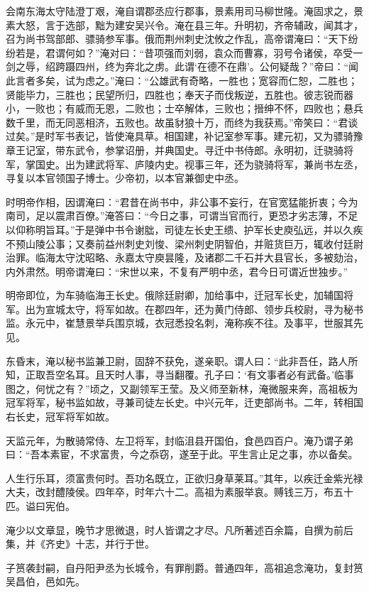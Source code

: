 \documentclass[12pt,UTF8]{ctexbook}
\begin{document}
会南东海太守陆澄丁艰，淹自谓郡丞应行郡事，景素用司马柳世隆。淹固求之，景素大怒，言于选部，黜为建安吴兴令。淹在县三年。升明初，齐帝辅政，闻其才，召为尚书驾部郎、骠骑参军事。俄而荆州刺史沈攸之作乱，高帝谓淹曰：“天下纷纷若是，君谓何如？”淹对曰：“昔项强而刘弱，袁众而曹寡，羽号令诸侯，卒受一剑之辱，绍跨蹑四州，终为奔北之虏。此谓‘在德不在鼎’。公何疑哉？”帝曰：“闻此言者多矣，试为虑之。”淹曰：“公雄武有奇略，一胜也；宽容而仁恕，二胜也；贤能毕力，三胜也；民望所归，四胜也；奉天子而伐叛逆，五胜也。彼志锐而器小，一败也；有威而无恩，二败也；士卒解体，三败也；搢绅不怀，四败也；悬兵数千里，而无同恶相济，五败也。故虽豺狼十万，而终为我获焉。”帝笑曰：“君谈过矣。”是时军书表记，皆使淹具草。相国建，补记室参军事。建元初，又为骠骑豫章王记室，带东武令，参掌诏册，并典国史。寻迁中书侍郎。永明初，迁骁骑将军，掌国史。出为建武将军、庐陵内史。视事三年，还为骁骑将军，兼尚书左丞，寻复以本官领国子博士。少帝初，以本官兼御史中丞。

时明帝作相，因谓淹曰：“君昔在尚书中，非公事不妄行，在官宽猛能折衷；今为南司，足以震肃百僚。”淹答曰：“今日之事，可谓当官而行，更恐才劣志薄，不足以仰称明旨耳。”于是弹中书令谢朏，司徒左长史王缋、护军长史庾弘远，并以久疾不预山陵公事；又奏前益州刺史刘悛、梁州刺史阴智伯，并赃货巨万，辄收付廷尉治罪。临海太守沈昭略、永嘉太守庾昙隆，及诸郡二千石并大县官长，多被劾治，内外肃然。明帝谓淹曰：“宋世以来，不复有严明中丞，君今日可谓近世独步。”

明帝即位，为车骑临海王长史。俄除廷尉卿，加给事中，迁冠军长史，加辅国将军。出为宣城太守，将军如故。在郡四年，还为黄门侍郎、领步兵校尉，寻为秘书监。永元中，崔慧景举兵围京城，衣冠悉投名刺，淹称疾不往。及事平，世服其先见。

东昏末，淹以秘书监兼卫尉，固辞不获免，遂亲职。谓人曰：“此非吾任，路人所知，正取吾空名耳。且天时人事，寻当翻覆。孔子曰：‘有文事者必有武备。’临事图之，何忧之有？”顷之，又副领军王莹。及义师至新林，淹微服来奔，高祖板为冠军将军，秘书监如故，寻兼司徒左长史。中兴元年，迁吏部尚书。二年，转相国右长史，冠军将军如故。

天监元年，为散骑常侍、左卫将军，封临沮县开国伯，食邑四百户。淹乃谓子弟曰：“吾本素宦，不求富贵，今之忝窃，遂至于此。平生言止足之事，亦以备矣。

人生行乐耳，须富贵何时。吾功名既立，正欲归身草莱耳。”其年，以疾迁金紫光禄大夫，改封醴陵侯。四年卒，时年六十二。高祖为素服举哀。赙钱三万，布五十匹。谥曰宪伯。

淹少以文章显，晚节才思微退，时人皆谓之才尽。凡所著述百余篇，自撰为前后集，并《齐史》十志，并行于世。

子筼袭封嗣，自丹阳尹丞为长城令，有罪削爵。普通四年，高祖追念淹功，复封筼吴昌伯，邑如先。
\end{document}
